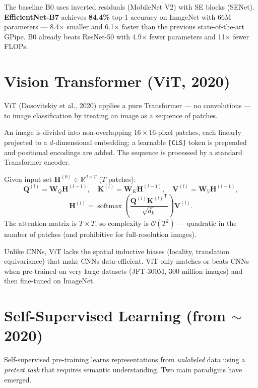 \documentclass[11pt, oneside]{book}
\newcommand{\R}{\mathbb{R}}
\newcommand{\T}{^{\mathsf{T}}}
\DeclareMathOperator{\softmax}{softmax}
\newcommand{\bigO}[1]{\mathcal{O}\!\left(#1\right)}
\begin{document}
The baseline B0 uses inverted residuals (MobileNet V2) with SE blocks (SENet).
\textbf{EfficientNet-B7} achieves \textbf{84.4\%} top-1 accuracy on ImageNet with
66M parameters — 8.4$\times$ smaller and 6.1$\times$ faster than the previous
state-of-the-art GPipe.
B0 already beats ResNet-50 with 4.9$\times$ fewer parameters and 11$\times$ fewer FLOPs.

\section{Vision Transformer (ViT, 2020)}

ViT (Dosovitskiy et al., 2020) applies a pure Transformer — no convolutions —
to image classification by treating an image as a sequence of patches.

An image is divided into non-overlapping $16\times16$-pixel patches,
each linearly projected to a $d$-dimensional embedding;
a learnable \texttt{[CLS]} token is prepended and positional encodings are added.
The sequence is processed by a standard Transformer encoder.

\begin{defbox}[title={Self-Attention (single head)}]
Given input set $\mathbf{H}^{(0)} \in \R^{d\times T}$ ($T$ patches):
\[
  \mathbf{Q}^{(l)} = \mathbf{W}_Q \mathbf{H}^{(l-1)},\quad
  \mathbf{K}^{(l)} = \mathbf{W}_K \mathbf{H}^{(l-1)},\quad
  \mathbf{V}^{(l)} = \mathbf{W}_V \mathbf{H}^{(l-1)},
\]
\[
  \mathbf{H}^{(l)} = \softmax\!\left(\frac{\mathbf{Q}^{(l)} {\mathbf{K}^{(l)}}\T}{\sqrt{d_k}}\right)\mathbf{V}^{(l)}.
\]
The attention matrix is $T\times T$, so complexity is $\bigO{T^2}$ —
quadratic in the number of patches (and prohibitive for full-resolution images).
\end{defbox}

\begin{notebox}[title={ViT requires large-scale pre-training}]
Unlike CNNs, ViT lacks the spatial inductive biases (locality, translation equivariance)
that make CNNs data-efficient.
ViT only matches or beats CNNs when pre-trained on very large datasets
(JFT-300M, 300 million images) and then fine-tuned on ImageNet.
\end{notebox}

\section{Self-Supervised Learning (from $\sim$2020)}

Self-supervised pre-training learns representations from \emph{unlabeled} data
using a \emph{pretext task} that requires semantic understanding.
Two main paradigms have emerged.
\end{document}
